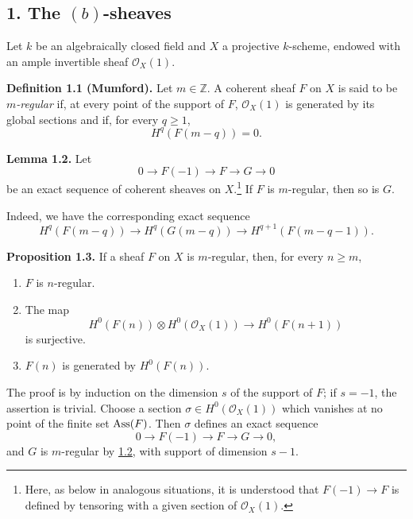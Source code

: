 \subsection*{1. The \texorpdfstring{\((b)\)}{(b)}-sheaves}

Let \(k\) be an algebraically closed field and \(X\) a projective
\(k\)-scheme, endowed with an ample invertible sheaf \(\mathcal O_X(1)\).

\textbf{Definition 1.1 (Mumford).} Let \(m\in\mathbb Z\). A coherent sheaf
\(F\) on \(X\) is said to be \emph{\(m\)-regular} if, at every point of the
support of \(F\), \(\mathcal O_X(1)\) is generated by its global sections
and if, for every \(q\geq1\),
\[
  H^q(F(m-q))=0.
\]

\textbf{Lemma 1.2.} Let
\[
  0\longrightarrow F(-1)\longrightarrow F\longrightarrow G\longrightarrow0
\]
be an exact sequence of coherent sheaves on \(X\).\footnote{Here, as below
in analogous situations, it is understood that \(F(-1)\to F\) is defined
by tensoring with a given section of \(\mathcal O_X(1)\).} If \(F\) is
\(m\)-regular, then so is \(G\).

Indeed, we have the corresponding exact sequence
\[
  H^q(F(m-q))\longrightarrow H^q(G(m-q))
  \longrightarrow H^{q+1}(F(m-q-1)).
\]

\textbf{Proposition 1.3.} If a sheaf \(F\) on \(X\) is \(m\)-regular,
then, for every \(n\geq m\),
\begin{enumerate}[label=(\roman*)]
\item \(F\) is \(n\)-regular.
\item The map
\[
  H^0(F(n))\otimes H^0(\mathcal O_X(1))
  \longrightarrow H^0(F(n+1))
\]
is surjective.
\item \(F(n)\) is generated by \(H^0(F(n))\).
\end{enumerate}

\newpage
The proof is by induction on the dimension \(s\) of the support of \(F\); if
\(s=-1\), the assertion is trivial. Choose a section
\(\sigma\in H^0(\mathcal O_X(1))\) which vanishes at no point of the finite
set \(\operatorname{Ass}(F)\). Then \(\sigma\) defines an exact sequence
\[
  0\longrightarrow F(-1)\longrightarrow F\longrightarrow G\longrightarrow0,
\]
and \(G\) is \(m\)-regular by \hyperlink{sga6.e13.lem.1-2}{1.2}, with support of dimension \(s-1\).

